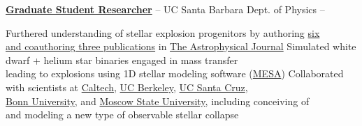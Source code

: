 \documentclass[letterpaper,MMMyyyy,nonstopmode]{simpleresumecv}
\begin{document}
\begin{Body}
\begin{Detail}

\Entry
\href{http://web.physics.ucsb.edu/~astrogroup/}
{\textbf{Graduate Student Researcher}} -- UC Santa Barbara Dept. of Physics \hfill {} --
\Gap





\BulletItem
Furthered understanding of stellar explosion progenitors by authoring \href{http://adsabs.harvard.edu/cgi-bin/nph-abs_connect?library&libname=MyPapers&libid=561872b258}{six \\ and coauthoring three publications} in \href{http://iopscience.iop.org/journal/0004-637X}{The Astrophysical Journal}
\BulletItem
Simulated white dwarf + helium star binaries engaged in mass transfer \\leading to explosions using 1D stellar modeling software (\href{http://mesa.sourceforge.net/}{MESA})
\BulletItem
Collaborated with scientists at \href{https://www.caltech.edu/}{Caltech}, \href{https://www.berkeley.edu/}{UC Berkeley}, \href{https://www.ucsc.edu}{UC Santa Cruz}, \\\href{https://www.uni-bonn.de/}{Bonn University}, and \href{https://www.msu.ru/en/}{Moscow State University}, including conceiving of \\and modeling a new type of observable stellar collapse
\vspace{2mm}


\end{Detail}
\end{Body}
\end{document}
